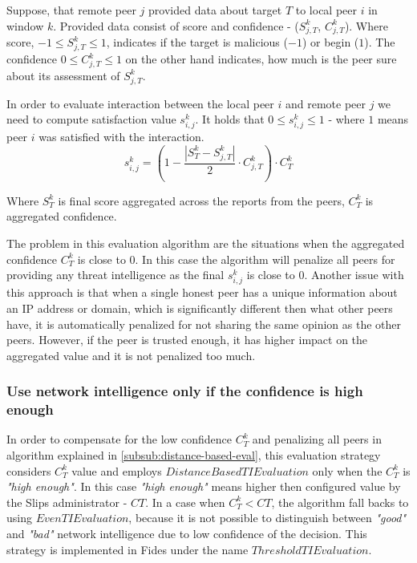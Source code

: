 Suppose, that remote peer $j$ provided data about target $T$ to local peer $i$ in window $k$. Provided data consist of score and confidence - ($S^{k}_{j, T}$, $C^{k}_{j, T}$). Where score,  $-1 \leq S^{k}_{j, T} \leq 1$, indicates if the target is malicious ($-1$) or begin ($1$). The confidence $0 \leq C^{k}_{j, T} \leq 1$ on the other hand indicates, how much is the peer sure about its assessment of $S^{k}_{j, T}$.

In order to evaluate interaction between the local peer $i$ and remote peer $j$ we need to compute satisfaction value $s^{k}_{i, j}$. 
It holds that  $0 \leq s^{k}_{i, j} \leq 1$ - where $1$ means peer $i$ was satisfied with the interaction.
\begin{equation}
s^{k}_{i, j} = \left(1 - \frac{|{S}^{k}_{T} - S^{k}_{j, T}|}{2} \cdot C^{k}_{j, T}\right) \cdot C^{k}_{T}
\end{equation}

Where $S^{k}_{T}$ is final score aggregated across the reports from the peers, $C^{k}_{T}$ is aggregated confidence.

The problem in this evaluation algorithm are the situations when the aggregated confidence $C^{k}_{T}$ is close to $0$. In this case the algorithm will penalize all peers for providing any threat intelligence as the final $s^{k}_{i, j}$ is close to $0$. Another issue with this approach is that when a single honest peer has a unique information about an IP address or domain, which is significantly different then what other peers have, it is automatically penalized for not sharing the same opinion as the other peers. However, if the peer is trusted enough, it has higher impact on the aggregated value and it is not penalized too much.

\subsubsection{Use network intelligence only if the confidence is high enough}
\label{subsubsec:network-intelligence-conf-high-enough}
In order to compensate for the low confidence $C^{k}_{T}$ and penalizing all peers in algorithm explained in \ref{subsub:distance-based-eval}, this evaluation strategy considers $C^{k}_{T}$ value and employs  $DistanceBasedTIEvaluation$ only when the  $C^{k}_{T}$ is \textit{"high enough"}. In this case \textit{"high enough"} means higher then configured value by the Slips administrator - ${CT}$.
In a case when  $C^{k}_{T} < {CT}$, the algorithm fall backs to using $EvenTIEvaluation$, because it is not possible to distinguish between \textit{"good"} and \textit{"bad"} network intelligence due to low confidence of the decision. 
This strategy is implemented in Fides under the name $ThresholdTIEvaluation$.

